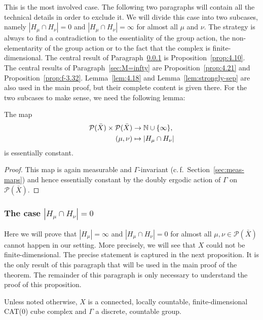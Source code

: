 This is the most involved case. The following two paragraphs will contain all the technical details in order to exclude it. We will divide this case into two subcases, namely \(|H_\mu \cap H_\nu| = 0\) and \(|H_\mu \cap H_\nu| = \infty\) for almost all \(\mu\) and \(\nu\). The strategy is always to find a contradiction to the essentiality of the group action, the non-elementarity of the group action or to the fact that the complex is finite-dimensional. The central result of Paragraph~\ref{sec:M=0} is Proposition~\ref{prop:4.10}. The central results of Paragraph~\ref{sec:M=infty} are Proposition~\ref{prop:4.21} and Proposition~\ref{prop:f-3.32}. Lemma~\ref{lem:4.18} and Lemma~\ref{lem:strongly-sep} are also used in the main proof, but their complete content is given there.
For the two subcases to make sense, we need the following lemma:

\begin{lemma}
  \label{lem:hh-const}
  The map
  \begin{align*}
    \mathcal{P}(\bar X) \times \mathcal{P}(\bar X) &\to \mathbb{N} \cup \{\infty\},\\
    (\mu, \nu) &\mapsto |H_\mu \cap H_\nu|
  \end{align*}
  is essentially constant.
\end{lemma}

\begin{proof}
  This map is again measurable and \(\Gamma\)-invariant (c.\,f.~Section~\ref{sec:meas-maps}) and hence essentially constant by the doubly ergodic action of \(\Gamma\) on \(\mathcal{P}(\bar X)\).
\end{proof}

\subsubsection{The case \(|H_\mu \cap H_\nu| = 0\)}
\label{sec:M=0}

Here we will prove that \(|H_\mu| = \infty\) and \(|H_\mu \cap H_\nu| = 0\) for almost all \(\mu, \nu \in \mathcal{P}(\bar X)\) cannot happen in our setting. More precisely, we will see that \(X\) could not be finite-dimensional. The precise statement is captured in the next proposition. It is the only result of this paragraph that will be used in the main proof of the theorem. The remainder of this paragraph is only necessary to understand the proof of this proposition.

Unless noted otherwise, \(X\) is a connected, locally countable, finite-dimensional CAT(0) cube complex and \(\Gamma\) a discrete, countable group.

